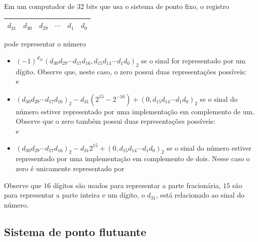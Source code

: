 \begin{ex}
Em um computador de 32 bits que usa o sistema de ponto fixo, o registro
\begin{center}
  \begin{tabular}{|c|c|c|c|c|c|} \hline
    $d_{31}$ & $d_{30}$ & $d_{29}$ & $\cdots$ & $d_1$ & $d_0$\\\hline
  \end{tabular}
\end{center}
pode representar o número
\begin{itemize}
\item $(-1)^{d_{31}}(d_{30}d_{29}\cdots d_{17}d_{16}, d_{15}d_{14}\cdots d_1d_0)_2$
se o sinal for representado por um dígito. Observe que, neste caso, o zero possui duas representações possíveis:
\begin{equation}
  [10000000000000000000000000000000]
\end{equation}
e
\begin{equation}
  [00000000000000000000000000000000]
\end{equation}
\item $(d_{30}d_{29}\cdots d_{17}d_{16})_2-d_{31}(2^{15}-2^{-16})+(0,d_{15}d_{14}\cdots d_1d_0)_2$
se o sinal do número estiver representado por uma implementação em complemento de um. Observe que o zero também possui duas representações possíveis:
\begin{equation}
  [11111111111111111111111111111111]
\end{equation}
e
\begin{equation}
  [00000000000000000000000000000000]
\end{equation}
\item $(d_{30}d_{29}\cdots d_{17}d_{16})_2-d_{31}2^{15}+(0,d_{15}d_{14}\cdots d_1d_0)_2$
se o sinal do número estiver representado por uma implementação em complemento de dois. Nesse caso o zero é unicamente representado por
\begin{equation}
  [00000000000000000000000000000000]
\end{equation}
\end{itemize}
Observe que $16$ dígitos são usados para representar a parte fracionária, $15$ são para representar a parte inteira e um dígito, o $d_{31}$, está relacionado ao sinal do número.
\end{ex}

\subsection{Sistema de ponto flutuante}

